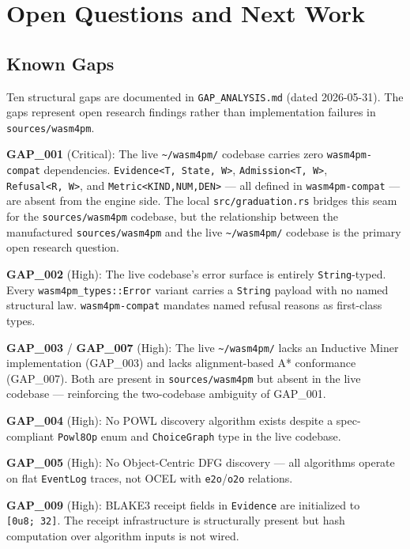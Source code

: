 \section{Open Questions and Next Work}
\label{sec:sources-wasm4pm-open-questions}

\subsection{Known Gaps}
\label{sec:sources-wasm4pm-gaps-known}

Ten structural gaps are documented in \texttt{GAP\_ANALYSIS.md} (dated 2026-05-31). The gaps
represent open research findings rather than implementation failures in \texttt{sources/wasm4pm}.

\textbf{GAP\_001} (Critical): The live \texttt{\textasciitilde/wasm4pm/} codebase carries zero
\texttt{wasm4pm-compat} dependencies. \texttt{Evidence<T,~State,~W>}, \texttt{Admission<T,~W>},
\texttt{Refusal<R,~W>}, and \texttt{Metric<KIND,NUM,DEN>} — all defined in \texttt{wasm4pm-compat}
— are absent from the engine side. The local \texttt{src/graduation.rs} bridges this seam for
the \texttt{sources/wasm4pm} codebase, but the relationship between the manufactured
\texttt{sources/wasm4pm} and the live \texttt{\textasciitilde/wasm4pm/} codebase is the
primary open research question.

\textbf{GAP\_002} (High): The live codebase's error surface is entirely \texttt{String}-typed.
Every \texttt{wasm4pm\_types::Error} variant carries a \texttt{String} payload with no named
structural law. \texttt{wasm4pm-compat} mandates named refusal reasons as first-class types.

\textbf{GAP\_003} / \textbf{GAP\_007} (High): The live \texttt{\textasciitilde/wasm4pm/} lacks
an Inductive Miner implementation (GAP\_003) and lacks alignment-based A* conformance
(GAP\_007). Both are present in \texttt{sources/wasm4pm} but absent in the live codebase —
reinforcing the two-codebase ambiguity of GAP\_001.

\textbf{GAP\_004} (High): No POWL discovery algorithm exists despite a spec-compliant
\texttt{Powl8Op} enum and \texttt{ChoiceGraph} type in the live codebase.

\textbf{GAP\_005} (High): No Object-Centric DFG discovery — all algorithms operate on flat
\texttt{EventLog} traces, not OCEL with \texttt{e2o}/\texttt{o2o} relations.

\textbf{GAP\_009} (High): BLAKE3 receipt fields in \texttt{Evidence} are initialized to
\texttt{[0u8;~32]}. The receipt infrastructure is structurally present but hash computation over
algorithm inputs is not wired.


